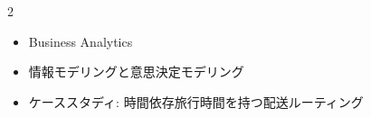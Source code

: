 \clearpage



\vspace{1.5mm}

\begin{multicols}{2}

\footnotesize

\raggedcolumns


\begin{itemize}
\item Business Analytics
\item 情報モデリングと意思決定モデリング
\item ケーススタディ: 時間依存旅行時間を持つ配送ルーティング
\end{itemize}

\end{multicols}